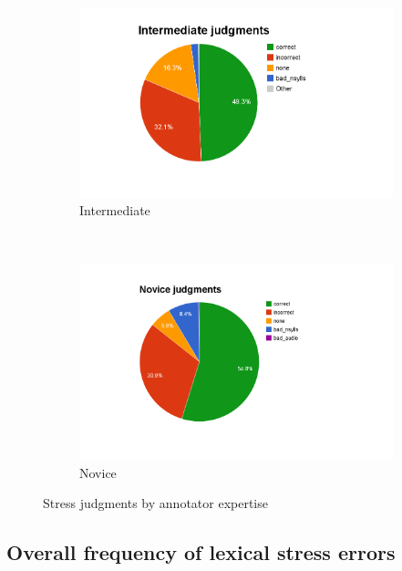 \begin{figure}[htb]
				\begin{subfigure}[b]{.5\textwidth}
					\centering
					\includegraphics[width=\textwidth]{img/annotation/intermediatePie}
					\caption{Intermediate}
					\label{fig:expertisepies:intermediate}
				\end{subfigure}%
				~
				\begin{subfigure}[b]{.5\textwidth}
					\centering
					\includegraphics[width=\textwidth]{img/annotation/novicePie}
					\caption{Novice}
					\label{fig:expertisepies:novice}
				\end{subfigure}%
				\caption{Stress judgments by annotator expertise}
				\label{fig:expertisepies}
			\end{figure}
			
			
		\subsection{Overall frequency of lexical stress errors}
		\label{sec:results:overall}
		
